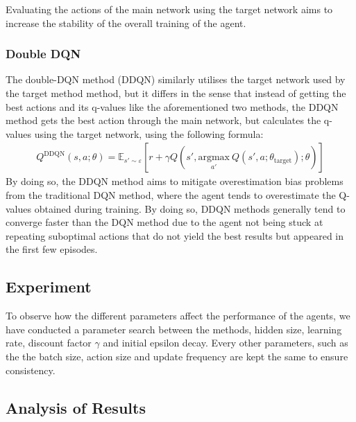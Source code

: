 Evaluating the actions of the main network using the target network aims to increase the stability of the overall training of the agent.

\subsubsection{Double DQN}
The double-DQN method (DDQN) similarly utilises the target network used by the target method method, but it differs in the sense that instead of getting the best actions and its q-values like the aforementioned two methods, the DDQN method gets the best action through the main network, but calculates the q-values using the target network, using the following formula:
\begin{align*}
    Q^{\text{DDQN}}(s, a ; \theta) = \mathbb{E}_{s' \sim \varepsilon}[r + \gamma Q(s', \underset{a'}{\text{argmax}}\ Q(s', a ; \theta_{\text{target}}) ; \theta)]
\end{align*}
By doing so, the DDQN method aims to mitigate overestimation bias problems from the traditional DQN method, where the agent tends to overestimate the Q-values obtained during training. By doing so, DDQN methods generally tend to converge faster than the DQN method due to the agent not being stuck at repeating suboptimal actions that do not yield the best results but appeared in the first few episodes.

\subsection{Experiment}
To observe how the different parameters affect the performance of the agents, we have conducted a parameter search between the methods, hidden size, learning rate, discount factor $\gamma$ and initial epsilon decay. Every other parameters, such as the the batch size, action size and update frequency are kept the same to ensure consistency. 

\subsection{Analysis of Results}

